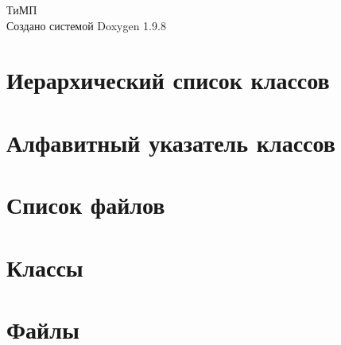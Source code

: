 \documentclass[twoside]{book}
\newcommand{\+}{\discretionary{\mbox{\scriptsize$\hookleftarrow$}}{}{}}
\newcommand{\clearemptydoublepage}{%
    \newpage{\pagestyle{empty}\cleardoublepage}%
  }
\begin{document}
  \raggedbottom
    \hypersetup{pageanchor=false,
                bookmarksnumbered=true,
                pdfencoding=unicode
               }
  \begin{titlepage}
  \vspace*{7cm}
  \begin{center}%
  {\Large ТиМП}\\
  \vspace*{1cm}
  {\large Создано системой Doxygen 1.9.8}\\
  \end{center}
  \end{titlepage}
  \clearemptydoublepage
  \tableofcontents
  \clearemptydoublepage
  \hypersetup{pageanchor=true}
\chapter{Иерархический список классов}

\chapter{Алфавитный указатель классов}

\chapter{Список файлов}

\chapter{Классы}


\chapter{Файлы}




  \backmatter
  \newpage
  \clearemptydoublepage
  \printindex
\end{document}
